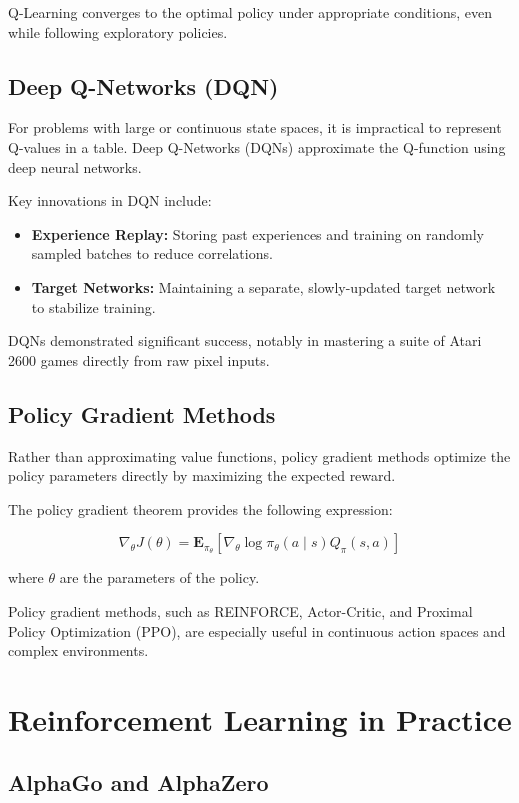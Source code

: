\documentclass[openany]{book}
\begin{document}
Q-Learning converges to the optimal policy under appropriate conditions, even 
while following exploratory policies.

\subsection{Deep Q-Networks (DQN)}

For problems with large or continuous state spaces, it is impractical to 
represent Q-values in a table. Deep Q-Networks (DQNs) approximate the Q-function 
using deep neural networks.

Key innovations in DQN include:

\begin{itemize}
    \item \textbf{Experience Replay:} Storing past experiences and training on 
    randomly sampled batches to reduce correlations.
    \item \textbf{Target Networks:} Maintaining a separate, slowly-updated 
    target network to stabilize training.
\end{itemize}

DQNs demonstrated significant success, notably in mastering a suite of Atari 
2600 games directly from raw pixel inputs.

\subsection{Policy Gradient Methods}

Rather than approximating value functions, policy gradient methods optimize the 
policy parameters directly by maximizing the expected reward.

The policy gradient theorem provides the following expression:

\[
\nabla_\theta J(\theta) = \mathbf{E}_{\pi_\theta} \left[ \nabla_\theta \log 
\pi_\theta(a \mid s) Q_\pi(s,a) \right]
\]

where \( \theta \) are the parameters of the policy.

Policy gradient methods, such as REINFORCE, Actor-Critic, and Proximal Policy
 Optimization (PPO), are especially useful in continuous action spaces and 
 complex environments.

\section{Reinforcement Learning in Practice}

\subsection{AlphaGo and AlphaZero}
\end{document}
